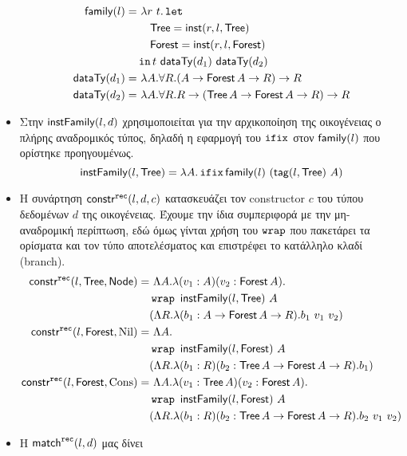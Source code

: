 \begin{itemize}
    \begin{align*} \mathsf{family}(l) =&\ \lambda r\ t . \operatorname{\texttt{let}} \\ &\quad\operatorname{\textsf{Tree}} =
      \mathsf{inst}(r, l, \operatorname{\textsf{Tree}})\\ &\quad\operatorname{\textsf{Forest}} = \mathsf{inst}(r, l, \operatorname{\textsf{Forest}})\\ &\operatorname{\texttt{in}} t\
      \mathsf{dataTy}(d_1)\ \mathsf{dataTy}(d_2)\\ \mathsf{dataTy}(d_1) =&\ \lambda A . \forall R .
      (A \rightarrow \operatorname{\textsf{Forest}} A \rightarrow R) \rightarrow R\\ \mathsf{dataTy}(d_2) =&\
    \lambda A . \forall R . R \rightarrow (\operatorname{\textsf{Tree}} A \rightarrow \operatorname{\textsf{Forest}} A
    \rightarrow R) \rightarrow R \end{align*} \item Στην $\mathsf{instFamily}(l, d)$
      χρησιμοποιείται για την αρχικοποίηση της οικογένειας ο πλήρης αναδρομικός
      τύπος, δηλαδή η εφαρμογή του $\operatorname{\texttt{ifix}}$ στον $\mathsf{family}(l)$ που ορίστηκε
      προηγουμένως.  $$\mathsf{instFamily}(l, \operatorname{\textsf{Tree}}) = \lambda A . \operatorname{\texttt{ifix}} \mathsf{family}(l)\
    (\mathsf{tag}(l, \operatorname{\textsf{Tree}})\ A)$$ \item Η συνάρτηση $\mathsf{constr}^{\operatorname{\texttt{rec}}}(l, d, c)$
      κατασκευάζει τον constructor $c$ του τύπου δεδομένων $d$ της οικογένειας.
      Έχουμε την ίδια συμπεριφορά με την μη-αναδρομική περίπτωση, εδώ όμως
      γίνται χρήση του $\operatorname{\texttt{wrap}}$ που πακετάρει τα ορίσματα και τον τύπο
      αποτελέσματος και επιστρέφει το κατάλληλο κλαδί (branch).  \begin{align*}
        \constrRec{l}{\Tree}{\Node} =&\ \Lambda A . \lambda (v_1 : A) (v_2 :
        \Forest A) .\\ &\wrap\ \dtInstFinal{l}{\Tree}\ A\\ &(\Lambda R .
        \lambda (b_1 : A \rightarrow \Forest A \rightarrow R) . b_1\ v_1\
        v_2)\\ \constrRec{l}{\Forest}{\NNil} =&\ \Lambda A . \\ &\wrap\
        \dtInstFinal{l}{\Forest}\ A\\ &(\Lambda R . \lambda (b_1 : R) (b_2 :
        \Tree A \rightarrow \Forest A \rightarrow R) . b_1)\\
        \constrRec{l}{\Forest}{\CCons} =&\ \Lambda A . \lambda (v_1 : \Tree A)
        (v_2 : \Forest A) . \\ &\wrap\ \dtInstFinal{l}{\Forest}\ A\\ &(\Lambda
        R . \lambda (b_1 : R) (b_2 : \Tree A \rightarrow \Forest A \rightarrow
        R) . b_2\ v_1\ v_2) \end{align*} \item Η $\mathsf{match}^{\operatorname{\texttt{rec}}}(l, d)$ μας δίνει

\end{itemize}
